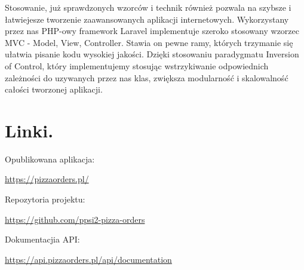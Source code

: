 \documentclass[12pt]{article}
\begin{document}
Stosowanie, już sprawdzonych wzorców i technik również pozwala na szybsze i łatwiejesze tworzenie zaawansowanych aplikacji internetowych. Wykorzystany przez nas PHP-owy framework Laravel implementuje szeroko stosowany wzorzec MVC - Model, View, Controller. Stawia on pewne ramy, których trzymanie się ułatwia pisanie kodu wysokiej jakości. Dzięki stosowaniu paradygmatu Inversion of Control, który implementujemy stosując wstrzykiwanie odpowiednich zależności do uzywanych przez nas klas, zwiększa modularność i skalowalność całości tworzonej aplikacji.

\clearpage

\section{Linki.}
\vspace{1cm}

Opublikowana aplikacja:

\url{https://pizzaorders.pl/}

\vspace{1cm}

Repozytoria projektu:

\url{https://github.com/ppsi2-pizza-orders}

\vspace{1cm}

Dokumentacjia API:

\url{https://api.pizzaorders.pl/api/documentation}
\end{document}

